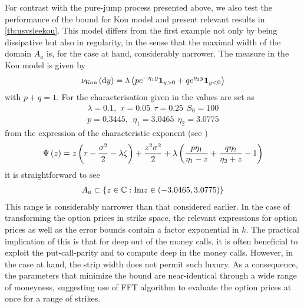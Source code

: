\documentclass[11pt]{amsart}
\begin{document}
For contrast with the pure-jump process presented above, we also test the performance
of the bound for Kou model and present relevant results in \ref{tb:usvsleekou}. This model differs from the first example not only by being dissipative
but also in regularity, in the sense that the maximal width of the domain $A_a$ is, for the 
case at hand, considerably narrower. The \levy measure in the Kou model is given by
\begin{align*}
\nu_{\mathrm{Kou}} \left( {\textrm{d} y} \right) = \lambda \left( { p e^{-\eta_1 y} \mathbf{1}_{y>0} + q e^{\eta_2 y} \mathbf{1}_{y<0} } \right)
\end{align*}
with $p+q=1$.
For the characterisation given in \cite{toivanen2007numerical} the
values are set as
\begin{align*}
\lambda = 0.1, ~~ r = 0.05 ~~ \tau = 0.25 ~~ S_0 = 100 \\
p = 0.3445, ~~ \eta_1 = 3.0465 ~~ \eta_2 = 3.0775
\end{align*}
from the expression of the characteristic exponent (see  \cite{kou2004option})
\begin{align*}
\Psi \left( {{z}} \right) = z \left( {r -\frac{\sigma^2}{2} - \lambda \zeta} \right) + \frac{z^2 \sigma^2}{2} 
+ \lambda \left( {\frac{p \eta_1}{\eta_1-z} + \frac{q \eta_2}{\eta_2 +z} -1} \right)
\end{align*}
it is straightforward to see
\begin{align*}
A_a \subset \left\lbrace {z \in \mathbb{C}: \mathrm{Im} z \in ( -3.0465, 3.0775)} \right\rbrace
\end{align*}
This range is considerably narrower than that considered earlier.
In the case of transforming the option prices in strike space, the
relevant expressions for option prices as well as the
error bounds contain a factor exponential in $k$. The practical implication
of this is that for deep out of the money calls, it is often beneficial to exploit
the put-call-parity and to compute deep in the money calls. However, in the case
at hand, the strip width does not permit such luxury. As a consequence,
the parameters that minimize the bound are near-identical through a wide range of moneyness,
suggesting use of FFT algorithm to evaluate the option prices at once for a range of strikes.
\end{document}
